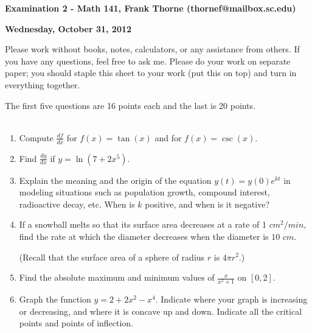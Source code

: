 \documentclass[12pt]{article}
\begin{document}
\setlength{\topmargin}{-2mm}





\begin{center}{\bf Examination 2 - Math 141, Frank Thorne (thornef@mailbox.sc.edu)}
\end{center}
\begin{center}
{\bf Wednesday, October 31, 2012}
\end{center}

Please work without books, notes, calculators, or any assistance from others. If you have
any questions, feel free to ask me. Please do your work on separate paper; you should staple this sheet to your work (put this on top)
and turn in everything together. 

The first five questions are 16 points each and the last is 20 points.
\\
\\
\begin{enumerate}[(1)]
\item
Compute $\frac{df}{dx}$ for $f(x) = \tan(x)$ and for $f(x) = \csc(x)$.

\item
Find $\frac{dy}{dx}$ if $y = \ln(7 + 2 x^5)$.

\item
Explain the meaning and the origin of the equation $y(t) = y(0) e^{kt}$ in modeling situations
such as population growth, compound interest, radioactive decay, etc. When is $k$ positive, and
when is it negative?

\item
If a snowball melts so that its surface area decreases at a rate of 1 $cm^2/min$, find the rate
at which the diameter decreases when the diameter is $10$ $cm$.

(Recall that the surface area of a sphere of radius $r$ is $4 \pi r^2$.)

\item
Find the absolute maximum and minimum values of $\frac{x}{x^2 + 1}$ on $[0, 2]$.
 
\item
Graph the function $y = 2 + 2 x^2 - x^4$. Indicate where your graph is increasing or decreasing,
and where it is concave up and down. Indicate all the critical points and points of inflection.

\end{enumerate}
\end{document}
